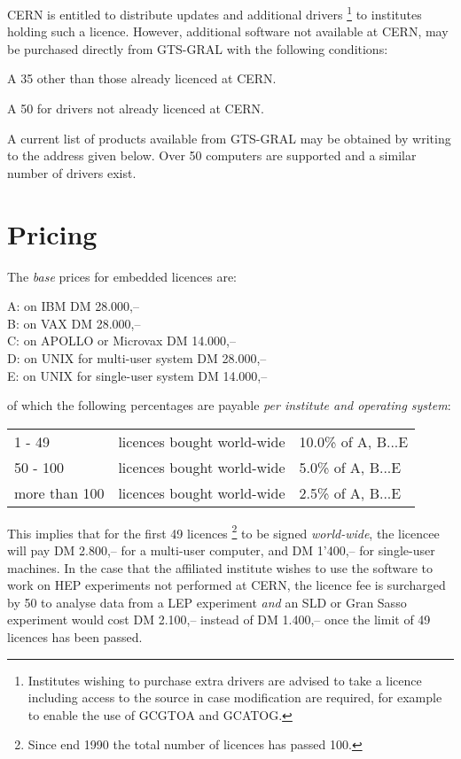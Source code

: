 CERN is entitled to distribute updates and additional drivers%
\footnote{Institutes wishing to purchase extra drivers are advised to
take a licence including access to the source in case modification
are required, for example to enable the use of GCGTOA and GCATOG.}
to institutes holding such a licence.
However, additional software not available at CERN, may be
purchased directly from GTS-GRAL with the following conditions:
\begin{OL}
\item A 35%
other than those already licenced at CERN.
\item A 50%
for drivers not already licenced at CERN.
\end{OL}
 
A current list of products available from GTS-GRAL may be obtained
by writing to the address given below. Over 50 computers are
supported and a similar number of drivers exist.
\section{Pricing}
The {\it base} prices for embedded licences are:
\begin{flushleft}
 A: on IBM DM 28.000,--                           \\
 B: on VAX DM 28.000,--                           \\
 C: on APOLLO or Microvax DM 14.000,--            \\
 D: on UNIX for multi-user system DM 28.000,--    \\
 E: on UNIX for single-user system DM 14.000,--   \\
\end{flushleft}

of which the following percentages are payable {\it per
institute and operating system}:
 
\begin{center}
\begin{tabular}{lll}
1 -  49  &licences bought world-wide  &10.0\%  of A, B...E\\
50 - 100 & licences bought world-wide & 5.0\% of A, B...E\\
more than 100 & licences bought world-wide & 2.5\% of A, B...E\\
\end{tabular}
\end{center}
 
This implies that for the first 49 licences%
\footnote{Since end 1990 the total number of licences has passed 100.}
to be signed {\it world-wide},
the licencee will pay DM 2.800,-- for a multi-user computer,
and DM 1'400,-- for single-user machines.
In the case that the affiliated institute wishes to use the software
to work on HEP experiments not performed at CERN, the licence fee
is surcharged by 50%
to analyse data from a LEP experiment {\it and} an SLD or Gran Sasso
experiment would cost DM 2.100,-- instead of DM 1.400,-- once the limit
of 49 licences has been passed.
 
